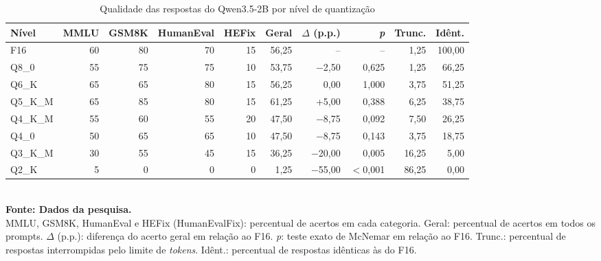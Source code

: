 \begin{table}[htb]
\centering
\caption{Qualidade das respostas do Qwen3.5-2B por nível de quantização}
\label{tab:qualidade-Qwen3.5-2B}
\small
\begin{tabular}{lrrrrrrrrr}
\hline
\textbf{Nível} & \textbf{MMLU} & \textbf{GSM8K} & \textbf{HumanEval} & \textbf{HEFix} & \textbf{Geral} & \textbf{$\Delta$ (p.p.)} & \textbf{\textit{p}} & \textbf{Trunc.} & \textbf{Idênt.} \\
\hline
F16 & 60 & 80 & 70 & 15 & 56,25 & -- & -- & 1,25 & 100,00 \\
Q8\_0 & 55 & 75 & 75 & 10 & 53,75 & $-$2,50 & 0,625 & 1,25 & 66,25 \\
Q6\_K & 65 & 65 & 80 & 15 & 56,25 & 0,00 & 1,000 & 3,75 & 51,25 \\
Q5\_K\_M & 65 & 85 & 80 & 15 & 61,25 & +5,00 & 0,388 & 6,25 & 38,75 \\
Q4\_K\_M & 55 & 60 & 55 & 20 & 47,50 & $-$8,75 & 0,092 & 7,50 & 26,25 \\
Q4\_0 & 50 & 65 & 65 & 10 & 47,50 & $-$8,75 & 0,143 & 3,75 & 18,75 \\
Q3\_K\_M & 30 & 55 & 45 & 15 & 36,25 & $-$20,00 & 0,005 & 16,25 & 5,00 \\
Q2\_K & 5 & 0 & 0 & 0 & 1,25 & $-$55,00 & $<$0,001 & 86,25 & 0,00 \\
\hline
\end{tabular}
\\[2pt]{\footnotesize \textbf{Fonte: Dados da pesquisa.}}
\\[2pt]{\footnotesize MMLU, GSM8K, HumanEval e HEFix (HumanEvalFix): percentual de acertos em cada categoria. Geral: percentual de acertos em todos os prompts. $\Delta$ (p.p.): diferença do acerto geral em relação ao F16. \textit{p}: teste exato de McNemar em relação ao F16. Trunc.: percentual de respostas interrompidas pelo limite de \textit{tokens}. Idênt.: percentual de respostas idênticas às do F16.}
\end{table}

